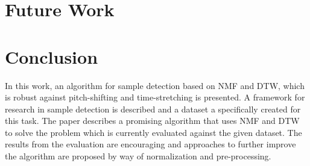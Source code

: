 \documentclass{article}
\begin{document}


\section{Future Work}


\section{Conclusion}

In this work, an algorithm for sample detection based on NMF and DTW, which is robust against pitch-shifting and time-stretching is presented. A framework for research in sample detection is described and a dataset a specifically created for this task. The paper describes a promising algorithm that uses NMF and DTW to solve the problem which is currently evaluated against the given dataset. The results from the evaluation are encouraging and approaches to further improve the algorithm are proposed by way of normalization and pre-processing.

\newpage


%
%
%
%
\end{document}
